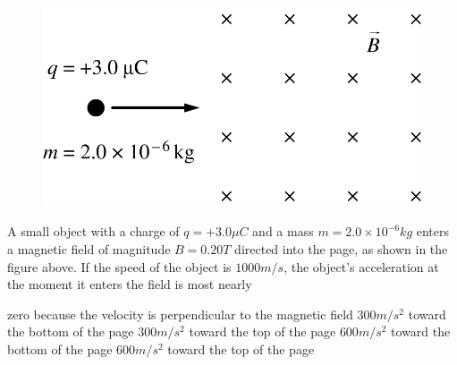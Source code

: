 \begin{figure}[H]
\centering
\includegraphics[scale=0.3]{images/img-012-028.png}
\end{figure}

\begin{questions}\setcounter{question}{28}\question
A small object with a charge of $q=+3.0 \unit{\mu C}$ and a mass $m=2.0 \times 10^{-6} \unit{kg}$ enters a magnetic field of magnitude $B=0.20 \unit{T}$ directed into the page, as shown in the figure above. If the speed of the object is $1000 \unit{m/s}$, the object's acceleration at the moment it enters the field is most nearly

\begin{choices}
\choice zero because the velocity is perpendicular to the magnetic field
\choice $300 \unit{m/s^2}$ toward the bottom of the page
\choice $300 \unit{m/s^2}$ toward the top of the page
\choice $600 \unit{m/s^2}$ toward the bottom of the page
\choice $600 \unit{m/s^2}$ toward the top of the page
\end{choices}\end{questions}
